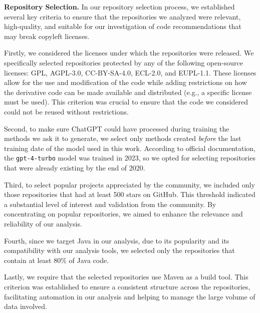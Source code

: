 \textbf{Repository Selection.} In our repository selection process, we established several key criteria to ensure that the repositories we analyzed were relevant, high-quality, and suitable for our investigation of code recommendations that may break copyleft licenses.

Firstly, we considered the licenses under which the repositories were released. We specifically selected repositories protected by any of the following open-source licenses: GPL, AGPL-3.0, CC-BY-SA-4.0, ECL-2.0, and EUPL-1.1. These licenses allow for the use and modification of the code while adding restrictions on how the derivative code can be made available and distributed (e.g., a specific license must be used). This criterion was crucial to ensure that the code we considered could not be reused without restrictions.

Second, to make sure ChatGPT could have processed during training the methods we ask it to generate, we select only methods created \emph{before} the last training date of the model used in this work.
According to official documentation, %
the \texttt{gpt-4-turbo} model was trained in 2023, so we opted for selecting repositories that were already existing by the end of 2020. %

Third, to select popular projects appreciated by the community, we included only those repositories that had at least 500 stars on GitHub. This threshold indicated a substantial level of interest and validation from the community. %
By concentrating on popular repositories, we aimed to enhance the relevance and reliability of our analysis.

Fourth, since we target Java in our analysis, due to its popularity and its compatibility with our analysis tools, we selected only the repositories that contain at least 80\% of Java code. 

Lastly, we require that the selected repositories use Maven as a build tool. This criterion was established to ensure a consistent structure across the repositories, facilitating automation in our analysis and helping to manage the large volume of data involved. %

